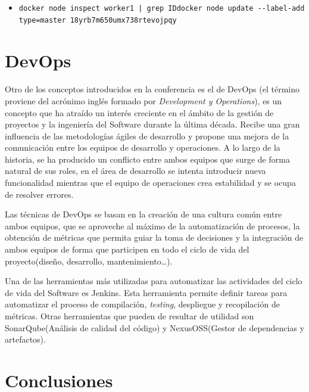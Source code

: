 \begin{itemize}[label=\textdollar]
\item \begin{lstlisting}
docker node inspect worker1 | grep IDdocker node update --label-add type=master 18yrb7m650umx738rtevojpqy
\end{lstlisting}
\end{itemize}



\section{DevOps}\label{sec:devops}

Otro de los conceptos introducidos en la conferencia es el de DevOps (el término proviene del acrónimo inglés formado por \textit{Development y Operations}), es un concepto que ha atraído un interés creciente en el ámbito de la gestión de proyectos y la ingeniería del Software durante la última década. Recibe una gran influencia de las metodologías ágiles de desarrollo y propone una mejora de la comunicación entre los equipos de desarrollo y operaciones. A lo largo de la historia, se ha producido un conflicto entre ambos equipos que surge de forma natural de sus roles, en el área de desarrollo se intenta introducir nueva funcionalidad mientras que el equipo de operaciones crea estabilidad y se ocupa de resolver errores. 

Las técnicas de DevOps se basan en la creación de una cultura común entre ambos equipos, que se aproveche al máximo de la automatización de procesos, la obtención de métricas que permita guiar la toma de decisiones y la integración de ambos equipos de forma que participen en todo el ciclo de vida del proyecto(diseño, desarrollo, mantenimiento…).

Una de las herramientas más utilizadas para automatizar las actividades del ciclo de vida del Software es Jenkins. Esta herramienta permite definir tareas para automatizar el proceso de compilación, \textit{testing}, despliegue y recopilación de métricas. Otras herramientas que pueden de resultar de utilidad son SonarQube(Análisis de calidad del código) y NexusOSS(Gestor de dependencias y artefactos).


\section{Conclusiones}\label{sec:conclu}

